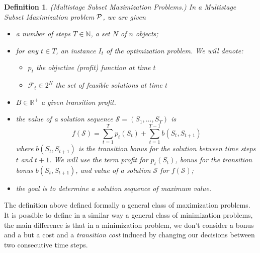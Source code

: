 \documentclass[a4paper]{book}
\newtheorem{definition}{Definition}
\begin{document}
\begin{definition}
\emph{(Multistage Subset Maximization Problems.)} In a Multistage Subset Maximization problem $\cal P$, we are given
\begin{itemize}
\item a number of steps $T \in \mathbb{N}$, a set $N$ of $n$ objects;
\item for any $t \in T$, an instance $I_t$ of the optimization problem. We will denote:
\begin{itemize}
\item $p_{t}$ the objective (profit) function at time $t$
\item $\mathcal{F}_t\in 2^N$ the set of feasible solutions at time $t$
\end{itemize} 
\item $B \in \mathbb{R^{+}}$ a given \textit{transition profit}. 
\item the value of a solution sequence $\mathcal{S}=(S_1,\dots,S_T)$ is $$f(\mathcal{S})=\sum_{t=1}^T p_t(S_t) + \sum_{t=1}^{T-1} b(S_t,S_{t+1})$$
where $b(S_t,S_{t+1})$ is the transition bonus for the solution between time steps $t$ and $t+1$. We will use the term {\it profit} for $ p_t(S_t)$, {\it bonus} for the transition bonus $b(S_t,S_{t+1})$, and {\it value} of a solution $\mathcal{S}$ for $f(\mathcal{S})$;
\item the goal is to determine a solution sequence of maximum value. 
\end{itemize}
\end{definition}

The definition above defined formally a general class of maximization problems. It is possible to define in a similar way a general class of minimization problems, the main difference is that in a minimization problem, we don't consider a bonus and a \textit{} but a cost and a \textit{transition cost} induced by changing our decisions between two consecutive time steps.
\end{document}
